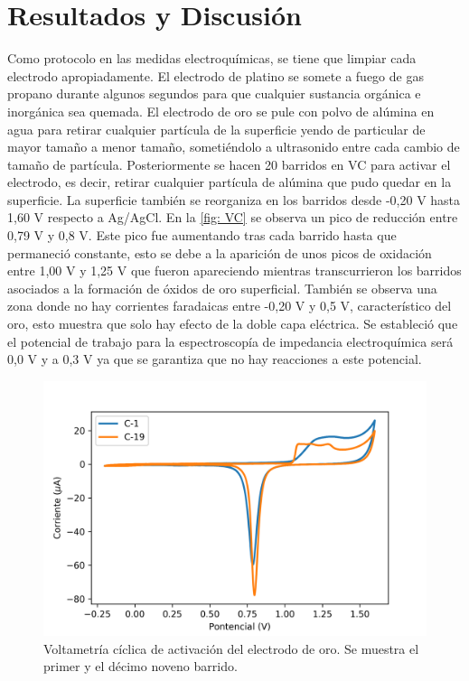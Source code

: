 \documentclass[fleqn,11pt]{SelfArx}
\begin{document}
	\section{Resultados y Discusi\'on}
	Como protocolo en las medidas electroquímicas, se tiene que limpiar cada electrodo apropiadamente. El electrodo de platino se somete a fuego de gas propano durante algunos segundos para que cualquier sustancia orgánica e inorgánica sea quemada. El electrodo de oro se pule con polvo de alúmina en agua para retirar cualquier partícula de la superficie yendo de particular de mayor tamaño a menor tamaño, sometiéndolo a ultrasonido entre cada cambio de tamaño de partícula. Posteriormente se hacen 20 barridos en VC para activar el electrodo, es decir, retirar cualquier partícula de alúmina que pudo quedar en la superficie. La superficie también se reorganiza en los barridos desde -0,20 V hasta 1,60 V respecto a Ag/AgCl. En la \autoref{fig: VC} se observa un pico de reducción entre 0,79 V y 0,8 V. Este pico fue aumentando tras cada barrido hasta que permaneció constante, esto se debe a la aparición de unos picos de oxidación entre 1,00 V y 1,25 V que fueron apareciendo mientras transcurrieron los barridos asociados a la formación de óxidos de oro superficial. También se observa una zona donde no hay corrientes faradaicas entre -0,20 V y 0,5 V, característico del oro, esto muestra que solo hay efecto de la doble capa eléctrica. Se estableció que el potencial de trabajo para la espectroscopía de impedancia electroquímica será 0,0 V y a 0,3 V ya que se garantiza que no hay reacciones a este potencial.
	\begin{figure}[h]
		\centering
		\includegraphics[width=\linewidth]{voltametrias}
		\caption{Voltametr\'ia c\'iclica de activaci\'on del electrodo de oro. Se muestra el primer y el d\'ecimo noveno barrido.}
		\label{fig: VC}
	\end{figure}
\end{document}
